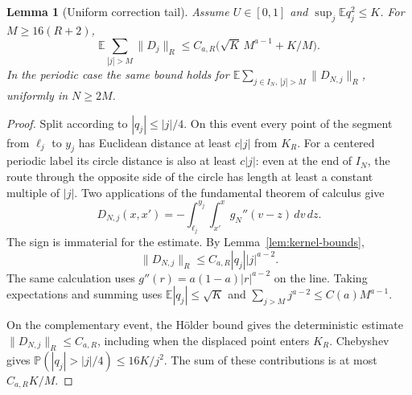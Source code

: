 \documentclass[11pt]{article}
\newtheorem{lemma}[theorem]{Lemma}
\theoremstyle{remark}\newtheorem{remark}[theorem]{Remark}
\newcommand{\E}{\mathbb E}
\newcommand{\Prob}{\mathbb P}
\begin{document}
\begin{lemma}[Uniform correction tail]\label{lem:tail}
Assume $U\in[0,1]$ and $\sup_j\E q_j^2\le K$. For
$M\ge16(R+2)$,
\begin{equation}\label{eq:tail-line}
 \E\sum_{|j|>M}\|D_j\|_R
       \le C_{a,R}\bigl(\sqrt K\,M^{a-1}+K/M\bigr).
\end{equation}
In the periodic case the same bound holds for
$\E\sum_{j\in I_N,\,|j|>M}\|D_{N,j}\|_R$, uniformly in
$N\ge2M$.
\end{lemma}
\begin{proof}
Split according to $|q_j|\le|j|/4$. On this event every point
of the segment from $\ell_j$ to $y_j$ has Euclidean distance
at least $c|j|$ from $K_R$. For a centered periodic label its
circle distance is also at least $c|j|$: even at the end of
$I_N$, the route through the opposite side of the circle has
length at least a constant multiple of $|j|$.
Two applications of the fundamental theorem of calculus give
\[
 D_{N,j}(x,x')
  =-\int_{\ell_j}^{y_j}\int_{x'}^x g_N''(v-z)\,dv\,dz.
\]
The sign is immaterial for the estimate. By
Lemma~\ref{lem:kernel-bounds},
\[
 \|D_{N,j}\|_R\le C_{a,R}|q_j||j|^{a-2}.
\]
The same calculation uses $g''(r)=a(1-a)|r|^{a-2}$ on the
line. Taking expectations and summing uses
$\E|q_j|\le\sqrt K$ and
$\sum_{j>M}j^{a-2}\le C(a)M^{a-1}$.

On the complementary event, the H\"older bound gives the
deterministic estimate $\|D_{N,j}\|_R\le C_{a,R}$, including
when the displaced point enters $K_R$. Chebyshev gives
$\Prob(|q_j|>|j|/4)\le16K/j^2$.
The sum of these contributions is at most $C_{a,R}K/M$.
\end{proof}
\end{document}
